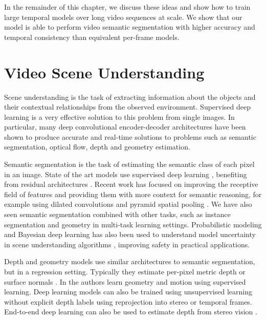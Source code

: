 In the remainder of this chapter, we discuss these ideas and show how to train large temporal models over long video sequences at scale. We show that our model is able to perform video semantic segmentation with higher accuracy and temporal consistency than equivalent per-frame models.



\section{Video Scene Understanding} 

Scene understanding is the task of extracting information about the objects and their contextual relationships from the observed environment. Supervised deep learning is a very effective solution to this problem from single images. In particular, many deep convolutional encoder-decoder architectures have been shown to produce accurate and real-time solutions to problems such as semantic segmentation, optical flow, depth and geometry estimation.

Semantic segmentation is the task of estimating the semantic class of each pixel in an image. State of the art models use supervised deep learning \citep{badrinarayanan2017segnet,long2015fully}, benefiting from residual architectures \citep{he2016deep,huang2017densely}. Recent work has focused on improving the receptive field of features and providing them with more context for semantic reasoning, for example using dilated convolutions \citep{YuKoltun2016} and pyramid spatial pooling \citep{zhao2017pspnet}. We have also seen semantic segmentation combined with other tasks, such as instance segmentation \citep{he2017maskrcnn} and geometry \citep{kendall2017multi} in multi-task learning settings. Probabilistic modeling and Bayesian deep learning has also been used to understand model uncertainty in scene understanding algorithms \citep{kendall2017uncertainties,kendall2015bayesian}, improving safety in practical applications.

Depth and geometry models use similar architectures to semantic segmentation, but in a regression setting. Typically they estimate per-pixel metric depth or surface normals \citep{eigen2015predicting}. In \citep{UZUMIDB17} the authors learn geometry and motion using supervised learning. Deep learning models can also be trained using unsupervised learning without explicit depth labels using reprojection into stereo \citep{garg2016unsupervised} or temporal \citep{zhou2017unsupervised} frames. End-to-end deep learning can also be used to estimate depth from stereo vision \citep{kendall2017end}.

